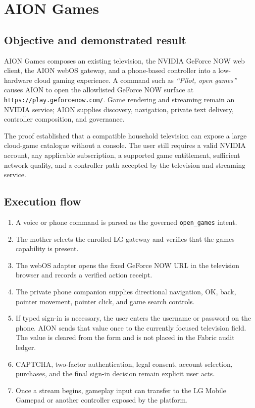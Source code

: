 \documentclass[11pt,a4paper]{article}
\begin{document}
\section{AION Games}

\subsection{Objective and demonstrated result}

AION Games composes an existing television, the NVIDIA GeForce NOW web client,
the AION webOS gateway, and a phone-based controller into a low-hardware cloud
gaming experience.  A command such as \emph{``Pilot, open games''} causes AION
to open the allowlisted GeForce NOW surface at
\texttt{https://play.geforcenow.com/}.  Game rendering and streaming remain an
NVIDIA service; AION supplies discovery, navigation, private text delivery,
controller composition, and governance.

The proof established that a compatible household television can expose a
large cloud-game catalogue without a console.  The user still requires a valid
NVIDIA account, any applicable subscription, a supported game entitlement,
sufficient network quality, and a controller path accepted by the television
and streaming service.

\subsection{Execution flow}

\begin{enumerate}[leftmargin=*,label=\arabic*.]
  \item A voice or phone command is parsed as the governed
        \texttt{open\_games} intent.
  \item The mother selects the enrolled LG gateway and verifies that the
        games capability is present.
  \item The webOS adapter opens the fixed GeForce NOW URL in the television
        browser and records a verified action receipt.
  \item The private phone companion supplies directional navigation, OK,
        back, pointer movement, pointer click, and game search controls.
  \item If typed sign-in is necessary, the user enters the username or
        password on the phone.  AION sends that value once to the currently
        focused television field.  The value is cleared from the form and is
        not placed in the Fabric audit ledger.
  \item CAPTCHA, two-factor authentication, legal consent, account selection,
        purchases, and the final sign-in decision remain explicit user acts.
  \item Once a stream begins, gameplay input can transfer to the LG Mobile
        Gamepad or another controller exposed by the platform.
\end{enumerate}
\end{document}
